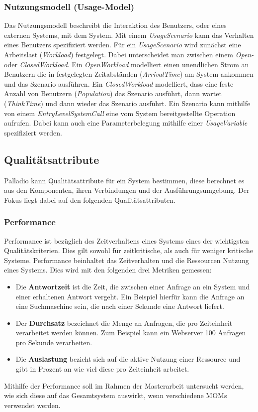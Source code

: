 \subsubsection{Nutzungsmodell (Usage-Model)}
Das Nutzungsmodell beschreibt die Interaktion des Benutzers, oder eines externen Systems, mit dem System. Mit einem \emph{UsageScenario} kann das Verhalten eines Benutzers spezifiziert werden. Für ein \emph{UsageScenario} wird zunächst eine Arbeitslast (\emph{Workload}) festgelegt. Dabei unterscheidet man zwischen einem \emph{Open-} oder \emph{ClosedWorkload}. Ein \emph{OpenWorkload} modelliert einen unendlichen Strom an Benutzern die in festgelegten Zeitabständen (\emph{ArrivalTime}) am System ankommen und das Szenario ausführen. Ein \emph{ClosedWorkload} modelliert, dass eine feste Anzahl von Benutzern (\emph{Population}) das Szenario ausführt, dann  wartet (\emph{ThinkTime}) und dann wieder das Szenario ausführt. Ein Szenario kann mithilfe von einem \emph{EntryLevelSystemCall} eine vom System bereitgestellte Operation aufrufen. Dabei kann auch eine Parameterbelegung mithilfe einer \emph{UsageVariable} spezifiziert werden. 
\subsection{Qualitätsattribute}
Palladio kann Qualitätsattribute für ein System bestimmen, diese berechnet es aus den Komponenten, ihren Verbindungen und der Ausführungsumgebung. Der Fokus liegt dabei auf den folgenden Qualitätsattributen. 
\subsubsection{Performance} 
Performance ist bezüglich des Zeitverhaltens eines Systems eines der wichtigsten Qualitätskriterien. Dies gilt sowohl für zeitkritische, als auch für weniger kritische Systeme. Performance beinhaltet das Zeitverhalten und die Ressourcen Nutzung eines Systems. Dies wird mit den folgenden drei Metriken gemessen:
\begin{itemize}
\item Die \textbf{Antwortzeit} ist die Zeit, die zwischen einer Anfrage an ein System und einer erhaltenen Antwort vergeht. Ein Beispiel hierfür kann die Anfrage an eine Suchmaschine sein, die nach einer Sekunde eine Antwort liefert.
\item Der \textbf{Durchsatz} bezeichnet die Menge an Anfragen, die pro Zeiteinheit verarbeitet werden können. Zum Beispiel kann ein Webserver 100 Anfragen pro Sekunde verarbeiten.
\item Die \textbf{Auslastung} bezieht sich auf die aktive Nutzung einer Ressource und gibt in Prozent an wie viel diese pro Zeiteinheit arbeitet. 
\end{itemize}
Mithilfe der Performance soll im Rahmen der Masterarbeit untersucht werden, wie sich diese auf das Gesamtsystem auswirkt, wenn verschiedene MOMs verwendet werden.

